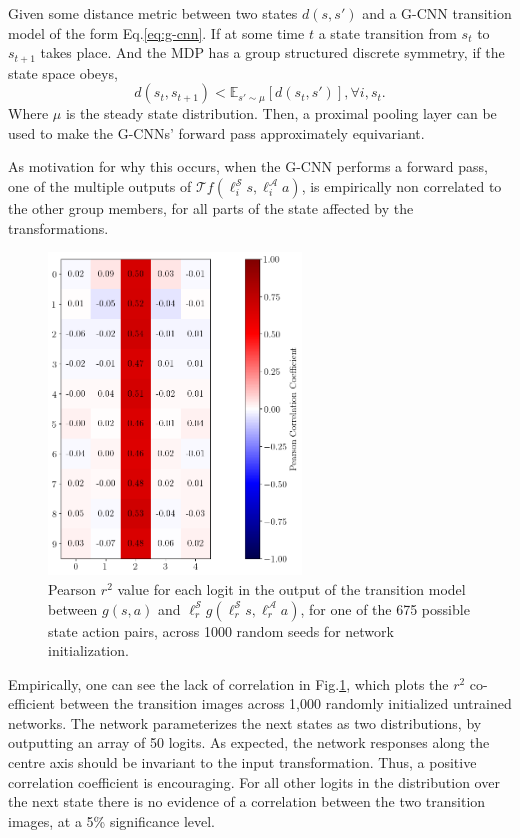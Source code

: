 \begin{proposition}
	Given some distance metric between two states $d(s, s')$ and a G-CNN transition model of the form Eq.\ref{eq:g-cnn}. If at some time $t$ a state transition from $s_t$ to $s_{t+1}$ takes place. And the MDP has a group structured discrete symmetry, if the state space obeys,
	\begin{equation}
		d(s_t, s_{t+1}) < \mathbb{E}_{s'\sim \mu}[d(s_t, s')], \forall i, s_t.
	\end{equation}
	Where $\mu$ is the steady state distribution. Then, a proximal pooling layer can be used to make the G-CNNs' forward pass approximately equivariant.
\end{proposition}
As motivation for why this occurs, when the G-CNN performs a forward pass, one of the multiple outputs of $\mathcal{T} f(\ell_i^\mathcal{S}s,\ell_i^\mathcal{A} a)$, is empirically non correlated to the other group members, for all parts of the state affected by the transformations.
\begin{figure}[h!]
	\centering
	\includegraphics[width = 0.6\textwidth]{Figures/logits_correlation.png}
	\caption{Pearson $r^2$ value for each logit in the output of the transition model between $g(s, a)$ and $\ell_r^\mathcal{S}g(\ell_r^\mathcal{S}s,\ell_r^\mathcal{A}a)$, for one of the 675 possible state action pairs, across 1000 random  seeds for network initialization. }
	\label{fig:logits_correlation}
\end{figure}
Empirically, one can see the lack of correlation in Fig.\ref{fig:logits_correlation}, which plots the $r^2$ co-efficient between the transition images across 1,000 randomly initialized untrained networks. The network parameterizes the next states as two distributions, by outputting an array of 50 logits. As expected, the network responses along the centre axis should be invariant to the input transformation. Thus, a positive correlation coefficient is encouraging. For all other logits in the distribution over the next state there is no evidence of a correlation between the two transition images, at a 5\% significance level.

